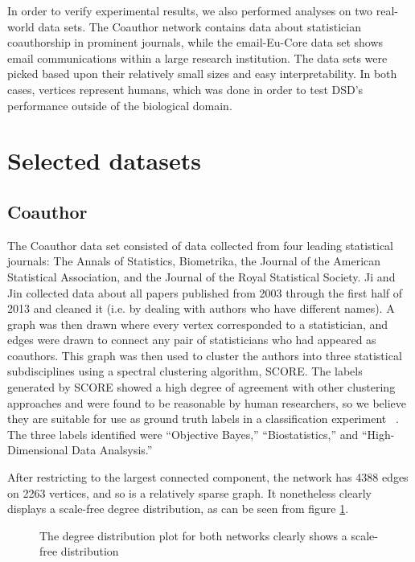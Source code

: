 In order to verify experimental results, we also performed analyses on two real-world data sets. The
Coauthor network contains data about statistician coauthorship in prominent journals, while the
email-Eu-Core data set shows email communications within a large research institution. The data sets
were picked based upon their relatively small sizes and easy interpretability. In both cases,
vertices represent humans, which was done in order to test DSD's performance outside of the
biological domain.


\section{Selected datasets}

\subsection{Coauthor}

The Coauthor data set consisted of data collected from four leading statistical journals: The Annals
of Statistics, Biometrika, the Journal of the American Statistical Association, and the Journal of
the Royal Statistical Society. Ji and Jin collected data about all papers published from 2003
through the first half of 2013 and cleaned it (i.e. by dealing with authors who have different
names). A graph was then drawn where every vertex corresponded to a statistician, and edges were
drawn to connect any pair of statisticians who had appeared as coauthors. This graph was then used
to cluster the authors into three statistical subdisciplines using a spectral clustering algorithm,
SCORE. The labels generated by SCORE showed a high degree of agreement with other clustering
approaches and were found to be reasonable by human researchers, so we believe they are suitable for
use as ground truth labels in a classification experiment ~\cite{ji2016}. The three labels
identified were ``Objective Bayes,'' ``Biostatistics,'' and ``High-Dimensional Data Analsysis.''

After restricting to the largest connected component, the network has 4388 edges on 2263 vertices,
and so is a relatively sparse graph. It nonetheless clearly displays a scale-free degree
distribution, as can be seen from figure \ref{fig:real_world_degree_dist}.

\begin{figure}
  \centering
  \caption{The degree distribution plot for both networks clearly shows a scale-free distribution}
  \label{fig:real_world_degree_dist}
\end{figure}


